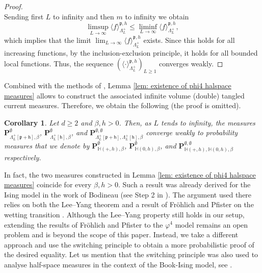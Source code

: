 \documentclass[11pt,a4paper]{article}
\newtheorem{corollary}[theorem]{Corollary}
\theoremstyle{definition}
\numberwithin{equation}{section}
\begin{document}
\begin{proof}
\begin{equation}
\end{equation}
Sending first $L$ to infinity and then $m$ to infinity we obtain 
\begin{equation}
\limsup_{L\to\infty} \langle f \rangle^{\mathfrak p,h}_{\Lambda_L^+} \leq \liminf_{L\to\infty} \langle f \rangle^{\mathfrak p,h}_{\Lambda_L^+},     
\end{equation}
which implies that the limit $\lim_{L\to\infty} \langle f \rangle^{\mathfrak p,h}_{\Lambda_L^+}$ exists. Since this holds for all increasing functions, by the inclusion-exclusion principle, it holds for all bounded local functions. Thus, the sequence $(\langle \cdot \rangle^{\mathfrak p,h}_{\Lambda_L^+})_{L\geq 1}$ converges weakly. 
\end{proof}

Combined with the methods of \cite[Section~5.1]{GunaratnamPanagiotisPanisSeveroPhi42022}, Lemma \ref{lem: existence of phi4 halspace measures} allows to construct the associated infinite volume (double) tangled current measures. Therefore, we obtain the following (the proof is omitted).

\begin{corollary}\label{cor: existence infinite halspace tangled measures} Let $d\geq 2$ and $\beta,h>0$. Then, as $L$ tends to infinity, the measures $\mathbf{P}^{\emptyset}_{\Lambda_L^+[\mathfrak{p}+\mathsf{h}],\beta}$, $\mathbf{P}^{\emptyset}_{\Lambda_L^+[\mathsf{h}],\beta}$, and $\mathbf{P}^{\emptyset,\emptyset}_{\Lambda_L^+[\mathfrak{p}+\mathsf{h}],\Lambda_L^+[\mathsf{h}],\beta}$ converge weakly to probability measures that we denote by $\mathbf{P}^\emptyset_{\mathbb H(+,h),\beta}$, $\mathbf{P}^\emptyset_{\mathbb H(0,h),\beta}$, and $\mathbf{P}^{\emptyset,\emptyset}_{\mathbb H(+,h),\mathbb H(0,h),\beta}$ respectively.
\end{corollary}

In fact, the two measures constructed in Lemma \ref{lem: existence of phi4 halspace measures} coincide for every $\beta,h>0$. Such a result was already derived for the Ising model in the work of Bodineau (see Step 2 in \cite[Lemma~3.1]{Bod05}). The argument used there relies on both the Lee--Yang theorem and a result of Fröhlich and Pfister on the wetting transition \cite{FP87}. Although the Lee--Yang property still holds in our setup, extending the results of Fröhlich and Pfister to the $\varphi^4$ model remains an open problem and is beyond the scope of this paper. Instead, we take a different approach and use the switching principle to obtain a more probabilistic proof of the desired equality. Let us mention that the switching principle was also used to analyse half-space measures in the context of the Book-Ising model, see \cite{duminil2023long}.
\end{document}
